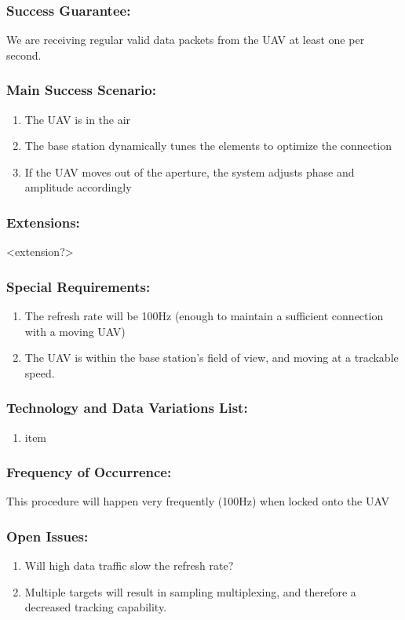 \documentclass[ProductRequirements.tex]{subfiles}
\begin{document}
	\subsubsection*{Success Guarantee:}
	We are receiving regular valid data packets from the UAV at least one per second. 
	\subsubsection*{Main Success Scenario:}
	\begin{enumerate}\itemsep1pt
		\item The UAV is in the air
		\item The base station dynamically tunes the elements to optimize the connection 
		\item If the UAV moves out of the aperture, the system adjusts phase and amplitude accordingly
	\end{enumerate}
	\subsubsection*{Extensions:}
	<extension?>
	\subsubsection*{Special Requirements:}
	\begin{enumerate}\itemsep1pt
		\item The refresh rate will be 100Hz (enough to maintain a sufficient connection with a moving UAV)
		\item The UAV is within the base station's field of view, and moving at a trackable speed. 
	\end{enumerate}
	\subsubsection*{Technology and Data Variations List:}
	\begin{enumerate}\itemsep1pt
		\item item
	\end{enumerate}
	\subsubsection*{Frequency of Occurrence:}
	This procedure will happen very frequently (100Hz) when locked onto the UAV
	\subsubsection*{Open Issues:}
	\begin{enumerate}\itemsep1pt
		\item Will high data traffic slow the refresh rate?
		\item Multiple targets will result in sampling multiplexing, and therefore a decreased tracking capability. 
	\end{enumerate}		
	
\end{document}
